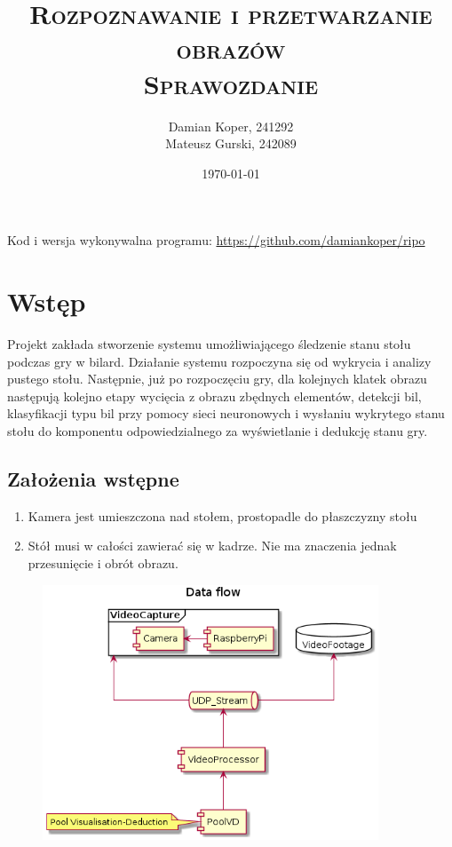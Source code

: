 \documentclass[12pt]{article}
\title{ 
    \vspace*{50mm}
    \textsc{
        \textbf{Rozpoznawanie i przetwarzanie obrazów}\\
        \large Sprawozdanie 
    }
}
\author{
Damian Koper,  241292\\
Mateusz Gurski, 242089
}
\date{\today}
\begin{document}
\maketitle

\newpage
\setcounter{tocdepth}{2}
\localtableofcontents
\listoffigures 
\lstlistoflistings
\vfill
Kod i wersja wykonywalna programu: \url{https://github.com/damiankoper/ripo}
\newpage

\section{Wstęp}
Projekt zakłada stworzenie systemu umożliwiającego śledzenie stanu stołu podczas gry w bilard. Działanie systemu rozpoczyna się od
wykrycia i analizy pustego stołu. Następnie, już po rozpoczęciu gry, dla kolejnych klatek obrazu następują kolejno etapy wycięcia z obrazu zbędnych elementów,
detekcji bil, klasyfikacji typu bil przy pomocy sieci neuronowych i wysłaniu wykrytego stanu stołu do komponentu odpowiedzialnego za wyświetlanie i dedukcję stanu gry.


\subsection{Założenia wstępne}
\begin{enumerate}[noitemsep]
    \item Kamera jest umieszczona nad stołem, prostopadle do płaszczyzny stołu
    \item Stół musi w całości zawierać się w kadrze. Nie ma znaczenia jednak przesunięcie i obrót obrazu.
\end{enumerate}

\vspace{2cm}

\begin{figure}[H]
    \centering
    \includegraphics[width=10cm]{./diagrams/out/Data_flow.png}
    \caption{}
    \label{}
\end{figure}
\end{document}

